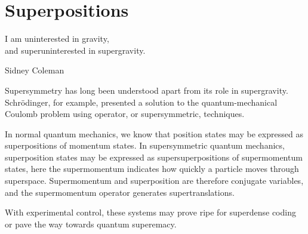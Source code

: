 \section{Superpositions}
\epigraph{I am uninterested in gravity,\\
and superuninterested in supergravity.}{Sidney Coleman\cite{vanNieuwenhuizen:2016}}

Supersymmetry has long been understood apart from its role in supergravity.
Schr\"{o}dinger, for example, presented a solution\cite{10.2307/20490744} to the quantum-mechanical Coulomb problem using operator, or supersymmetric, techniques\cite{RevModPhys.23.21}.

In normal quantum mechanics, we know that position states may be expressed as superpositions of momentum states.
In supersymmetric quantum mechanics, superposition states may be expressed as supersuperpositions of supermomentum states, here the supermomentum indicates how quickly a particle moves through superspace.
Supermomentum and superposition are therefore conjugate variables, and the supermomentum operator generates supertranslations.

With experimental control, these systems may prove ripe for superdense coding\cite{PhysRevLett.69.2881} or pave the way towards quantum superemacy\cite{Preskill:2012tg}.